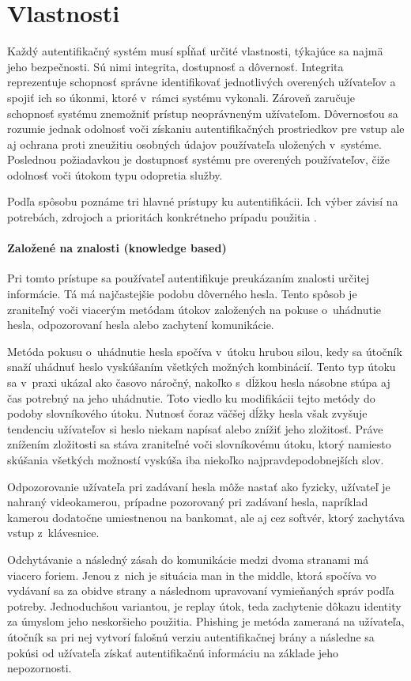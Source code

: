 \section{Vlastnosti}
Každý autentifikačný systém musí spĺňať určité vlastnosti, týkajúce sa najmä jeho bezpečnosti. Sú nimi integrita, dostupnosť a dôvernosť. Integrita reprezentuje schopnosť správne identifikovať jednotlivých overených užívateľov a spojiť ich so úkonmi, ktoré v~rámci systému vykonali. Zároveň zaručuje schopnosť systému znemožniť prístup neoprávneným užívateľom. Dôvernosťou sa rozumie jednak odolnosť voči získaniu autentifikačných prostriedkov pre vstup ale aj ochrana proti zneužitiu osobných údajov používateľa uložených v~systéme. Poslednou požiadavkou je dostupnosť systému pre overených používateľov, čiže odolnosť voči útokom typu odopretia služby.

Podľa spôsobu poznáme tri hlavné prístupy ku autentifikácii. Ich výber závisí na potrebách, zdrojoch a prioritách konkrétneho prípadu použitia \cite{authentication_systems2}.

\paragraph{Založené na znalosti (knowledge based)}
Pri tomto prístupe sa používateľ autentifikuje preukázaním znalosti určitej informácie. Tá má najčastejšie podobu dôverného hesla. Tento spôsob je zraniteľný voči viacerým metódam útokov založených na pokuse o~uhádnutie hesla, odpozorovaní hesla alebo zachytení komunikácie.

Metóda pokusu o~uhádnutie hesla spočíva v~útoku hrubou silou, kedy sa útočník snaží uhádnuť heslo vyskúšaním všetkých možných kombinácií. Tento typ útoku sa v~praxi ukázal ako časovo náročný, nakoľko s~dĺžkou hesla násobne stúpa aj čas potrebný na jeho uhádnutie. Toto viedlo ku modifikácii tejto metódy do podoby slovníkového útoku. Nutnosť čoraz väčšej dĺžky hesla však zvyšuje tendenciu užívateľov si heslo niekam napísať alebo znížiť jeho zložitosť. Práve znížením zložitosti sa stáva zraniteľné  voči slovníkovému útoku, ktorý namiesto skúšania všetkých možností vyskúša iba niekoľko najpravdepodobnejších slov.

Odpozorovanie užívateľa pri zadávaní hesla môže nastať ako fyzicky, užívateľ je nahraný videokamerou, prípadne pozorovaný pri zadávaní hesla, napríklad kamerou dodatočne umiestnenou na bankomat, ale aj cez softvér, ktorý zachytáva vstup z~klávesnice.

Odchytávanie a následný zásah do komunikácie medzi dvoma stranami má viacero foriem. Jenou z~nich je situácia man in the middle, ktorá spočíva vo vydávaní sa za obidve strany a následnom upravovaní vymieňaných správ podľa potreby. Jednoduchšou variantou, je replay útok, teda zachytenie dôkazu identity za úmyslom jeho neskoršieho použitia. Phishing je metóda zameraná na užívateľa, útočník sa pri nej vytvorí falošnú verziu autentifikačnej brány a následne sa pokúsi od užívateľa získať autentifikačnú informáciu na základe jeho nepozornosti.

